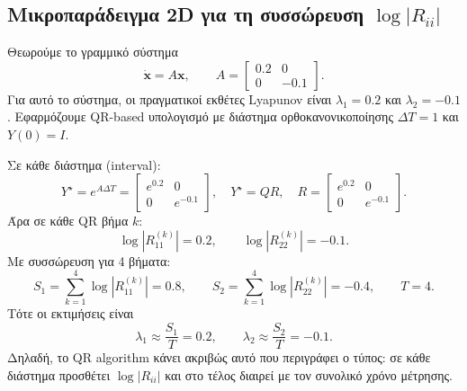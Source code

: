 \documentclass[11pt,a4paper]{report}
\begin{document}
\subsection{Μικροπαράδειγμα 2D για τη συσσώρευση \texorpdfstring{$\log|R_{ii}|$}{log|Rii|}}
Θεωρούμε το γραμμικό σύστημα
\begin{equation}
\dot{\mathbf{x}}=A\mathbf{x},\qquad
A=
\begin{bmatrix}
0.2 & 0\\
0 & -0.1
\end{bmatrix}.
\end{equation}
Για αυτό το σύστημα, οι πραγματικοί εκθέτες Lyapunov είναι $\lambda_1=0.2$ και $\lambda_2=-0.1$.
Εφαρμόζουμε QR-based υπολογισμό με διάστημα ορθοκανονικοποίησης $\Delta T=1$ και $Y(0)=I$.

Σε κάθε διάστημα (interval):
\begin{equation}
Y^\star = e^{A\Delta T}=
\begin{bmatrix}
e^{0.2} & 0\\
0 & e^{-0.1}
\end{bmatrix},
\quad
Y^\star = QR,
\quad
R=
\begin{bmatrix}
e^{0.2} & 0\\
0 & e^{-0.1}
\end{bmatrix}.
\end{equation}
Άρα σε κάθε QR βήμα $k$:
\begin{equation}
\log|R_{11}^{(k)}|=0.2,\qquad \log|R_{22}^{(k)}|=-0.1.
\end{equation}
Με συσσώρευση για 4 βήματα:
\begin{equation}
S_1=\sum_{k=1}^{4}\log|R_{11}^{(k)}|=0.8,\qquad
S_2=\sum_{k=1}^{4}\log|R_{22}^{(k)}|=-0.4,\qquad
T=4.
\end{equation}
Τότε οι εκτιμήσεις είναι
\begin{equation}
\lambda_1\approx \frac{S_1}{T}=0.2,\qquad
\lambda_2\approx \frac{S_2}{T}=-0.1.
\end{equation}
Δηλαδή, το QR algorithm κάνει ακριβώς αυτό που περιγράφει ο τύπος:
σε κάθε διάστημα προσθέτει $\log|R_{ii}|$ και στο τέλος διαιρεί με τον συνολικό χρόνο μέτρησης.
\end{document}
